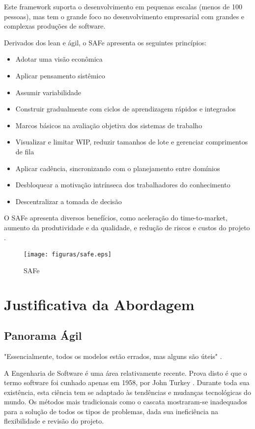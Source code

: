 Este framework suporta o desenvolvimento em pequenas escalas (menos de 100 pessoas), mas tem o grande foco no desenvolvimento
empresarial com grandes e complexas produções de software.

Derivados dos lean e ágil, o SAFe apresenta os seguintes princípios:
\begin{itemize}
 	\item Adotar uma visão econômica
 	\item Aplicar pensamento sistêmico
 	\item Assumir variabilidade
 	\item Construir gradualmente com ciclos de aprendizagem rápidos e integrados
	\item Marcos básicos na avaliação objetiva dos sistemas de trabalho
	\item Visualizar e limitar WIP, reduzir tamanhos de lote e gerenciar comprimentos de fila
	\item Aplicar cadência, sincronizando com o planejamento entre domínios
 	\item Desbloquear a motivação intrínseca dos trabalhadores do conhecimento
 	\item Descentralizar a tomada de decisão
\end{itemize}

 O SAFe apresenta diversos benefícios, como aceleração do time-to-market, aumento da produtividade e da qualidade, e
 redução de riscos e custos do projeto \cite{turetken2016}.

 \begin{figure}[h]
 	\centering
 	\texttt{[image: figuras/safe.eps]}
 	\caption{SAFe}
 	\label{fig01}
 \end{figure}

\section{Justificativa da Abordagem}
\subsection{Panorama Ágil}
"Essencialmente, todos os modelos estão errados, mas alguns são úteis" \cite{box2005}.

A Engenharia de Software é uma área relativamente recente. Prova disto é que o termo software foi cunhado apenas em 1958,
por John Turkey \cite{swebok2004}. Durante toda sua existência, esta ciência tem se adaptado às tendências e mudanças
tecnológicas do mundo. Os métodos mais tradicionais como o cascata mostraram-se inadequados para a solução de todos os tipos
 de problemas, dada sua ineficiência na flexibilidade e revisão do projeto.

